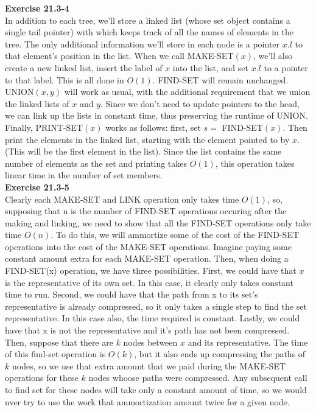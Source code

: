\documentclass{article}
\begin{document}
\noindent\textbf{Exercise 21.3-4}\\

In addition to each tree, we'll store a linked list (whose set object contains a single tail pointer) with which keeps track of all the names of elements in the tree.  The only additional information we'll store in each node is a pointer $x.l$ to that element's position in the list.  When we call MAKE-SET$(x)$, we'll also create a new linked list, insert the label of $x$ into the list, and set $x.l$ to a pointer to that label.  This is all done in $O(1)$.  FIND-SET will remain unchanged.  UNION$(x,y)$ will work as usual, with the additional requirement that we union the linked lists of $x$ and $y$. Since we don't need to update pointers to the head, we can link up the lists in constant time, thus preserving the runtime of UNION.   Finally, PRINT-SET$(x)$ works as follows: first, set $s = $ FIND-SET$(x)$.  Then print the elements in the linked list, starting with the element pointed to by $x$.  (This will be the first element in the list).  Since the list contains the same number of elements as the set and printing takes $O(1)$, this operation takes linear time in the number of set members. \\

\noindent\textbf{Exercise 21.3-5}\\

Clearly each MAKE-SET and LINK operation only takes time $O(1)$, so, supposing that n is the number of FIND-SET operations occuring after the making and linking, we need to show that all the FIND-SET operations only take time $O(n)$. To do this, we will ammortize some of the cost of the FIND-SET operations into the cost of the MAKE-SET operations. Imagine paying some constant amount extra for each MAKE-SET operation. Then, when doing a FIND-SET(x) operation, we have three possibilities. First, we could have that $x$ is the representative of its own set. In this case, it clearly only takes constant time to run. Second, we could have that the path from x to its set's representative is already compressed, so it only takes a single step to find the set representative. In this case also, the time required is constant. Lastly, we could have that x is not the representative and it's path has not been compressed. Then, suppose that there are $k$ nodes between $x$ and its representative. The time of this find-set operation is $O(k)$, but it also ends up compressing the paths of $k$ nodes, so we use that extra amount that we paid during the MAKE-SET operations for these $k$ nodes whoose paths were compressed. Any subsequent call to find set for these nodes will take only a constant amount of time, so we would nver try to use the work that ammortization amount twice for a given node.\\
\end{document}
